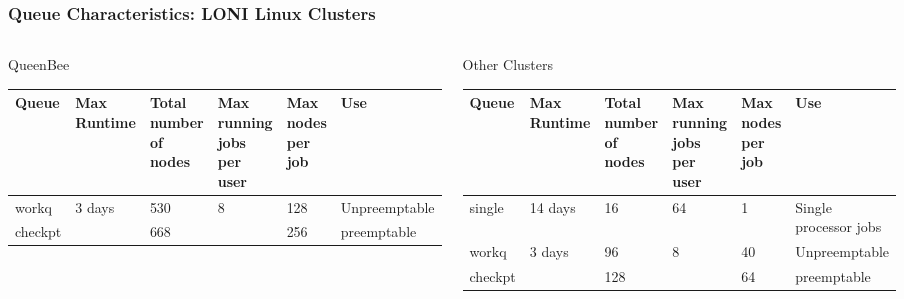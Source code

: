 \documentclass[slidestop,mathserif,compress,xcolor=svgnames,table]{beamer}
\newenvironment{bblock}[0]
{
\begin{beamerboxesrounded}[upper=uppercol1,lower=lowercol1,shadow=true]}
{\end{beamerboxesrounded}}
\begin{document}
\begin{frame}
\frametitle{\small Queue Characteristics: LONI Linux Clusters}
\begin{columns}
\column{12cm}
\begin{bblock}{QueenBee}
{\scriptsize
\begin{center}
\begin{tabular}{|m{}|m{}|m{}|m{}|m{}|m{}|}
\hline
Queue & Max Runtime & Total number of nodes & Max running jobs per user & Max nodes per job & Use \\
\hline
workq & \multirow{2}{*}{3 days} & 530 & \multirow{2}{*}{8} & 128 & Unpreemptable \\
\cline{1-1}\cline{3-3}\cline{5-6}
checkpt & & 668 & & 256 & preemptable\\
\cline{1-6}
\end{tabular}
\end{center}
}
\end{bblock}
\vspace{0.5cm}
\begin{bblock}{Other Clusters}
{\scriptsize
\begin{center}
\begin{tabular}{|m{}|m{}|m{}|m{}|m{}|m{}|}
\hline
Queue & Max Runtime & Total number of nodes & Max running jobs per user & Max nodes per job & Use \\
\hline
single & 14 days & 16 & 64 & 1 & Single processor jobs \\\hline
workq & \multirow{2}{*}{3 days} & 96 & \multirow{2}{*}{8} & 40 & Unpreemptable \\
\cline{1-1}\cline{3-3}\cline{5-6}
checkpt & & 128 & & 64 & preemptable\\
\hline
\end{tabular}
\end{center}
}
\end{bblock}
\end{columns}
\end{frame}
\end{document}
